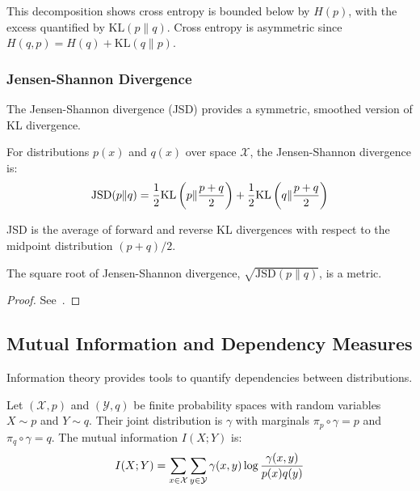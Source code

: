 This decomposition shows cross entropy is bounded below by $H(p)$, with the excess quantified by $\text{KL}(p \| q)$. Cross entropy is asymmetric since $H(q, p) = H(q) + \text{KL}(q \| p)$.

\subsubsection{Jensen-Shannon Divergence}
The Jensen-Shannon divergence (JSD) provides a symmetric, smoothed version of KL divergence.

\begin{definition}%
  \label{def:jsd}
  For distributions $p(x)$ and $q(x)$ over space $\mathcal{X}$, the \textnormal{\sffamily Jensen-Shannon divergence} is:
  \begin{align}
    \text{JSD}(p \| q) = {1 \over 2} \text{KL}\left(p \| {p + q \over 2}\right) + {1 \over 2} \text{KL}\left(q \| {p + q \over 2}\right)
  \end{align}
\end{definition}

\begin{remark}
  JSD is the average of forward and reverse KL divergences with respect to the midpoint distribution $(p+q)/2$.
\end{remark}

\begin{theorem}
  The square root of Jensen-Shannon divergence, $\sqrt{\text{JSD}(p \| q)}$, is a metric.
\end{theorem}
\begin{proof}
  See~\cite{ref:endres-2003}.
\end{proof}

\subsection{Mutual Information and Dependency Measures}
Information theory provides tools to quantify dependencies between distributions.

\begin{definition}
  Let $(\mathcal{X}, p)$ and $(\mathcal{Y}, q)$ be finite probability spaces with random variables $X \sim p$ and $Y \sim q$. Their joint distribution is $\gamma$ with marginals $\pi_p \circ \gamma = p$ and $\pi_q \circ \gamma = q$. The \textnormal{\sffamily mutual information} $I(X;Y)$ is:
  \begin{align}
    \label{eq:mutual-information}
    I(X; Y) = \sum_{x \in \mathcal{X}}\sum_{y \in \mathcal{Y}}\gamma(x, y) \log{{\gamma(x, y) \over p(x)q(y)}}
  \end{align}
\end{definition}

